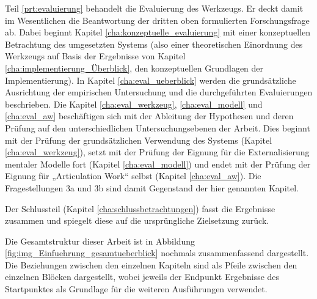 Teil \ref{prt:evaluierung} behandelt die Evaluierung des Werkzeugs. Er deckt damit im Wesentlichen die Beantwortung der dritten oben formulierten Forschungsfrage ab. Dabei beginnt Kapitel \ref{cha:konzeptuelle_evaluierung} mit einer konzeptuellen Betrachtung des umgesetzten Systems (also einer theoretischen Einordnung des Werkzeugs auf Basis der Ergebnisse von Kapitel \ref{cha:implementierung_Überblick}, den konzeptuellen Grundlagen der Implementierung). In Kapitel \ref{cha:eval_ueberblick} werden die grundsätzliche Ausrichtung der empirischen Untersuchung und die durchgeführten Evaluierungen beschrieben. Die Kapitel \ref{cha:eval_werkzeug}, \ref{cha:eval_modell} und \ref{cha:eval_aw} beschäftigen sich mit der Ableitung der Hypothesen und deren Prüfung auf den unterschiedlichen Untersuchungsebenen der Arbeit. Dies beginnt mit der Prüfung der grundsätzlichen Verwendung des Systems (Kapitel \ref{cha:eval_werkzeug}), setzt mit der Prüfung der Eignung für die Externalisierung mentaler Modelle fort (Kapitel \ref{cha:eval_modell}) und endet mit der Prüfung der Eignung für „Articulation Work“ selbst (Kapitel \ref{cha:eval_aw}). Die Fragestellungen 3a und 3b sind damit Gegenstand der hier genannten Kapitel.

Der Schlussteil (Kapitel \ref{cha:schlussbetrachtungen}) fasst die Ergebnisse zusammen und spiegelt diese auf die ursprüngliche Zielsetzung zurück.

Die Gesamtstruktur dieser Arbeit ist in Abbildung \ref{fig:img_Einfuehrung_gesamtueberblick} nochmals zusammenfassend dargestellt. Die Beziehungen zwischen den einzelnen Kapiteln sind als Pfeile zwischen den einzelnen Blöcken dargestellt, wobei jeweils der Endpunkt Ergebnisse des Startpunktes als Grundlage für die weiteren Ausführungen verwendet.

